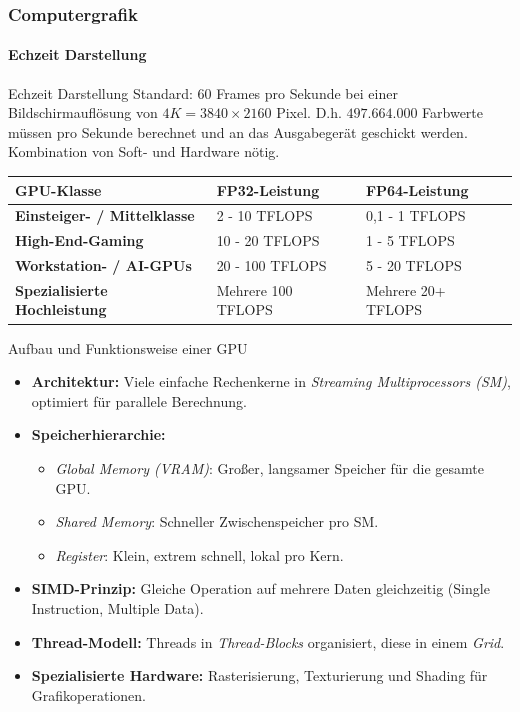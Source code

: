 \documentclass{beamer}
\begin{document}
\begin{frame}
    \frametitle{Computergrafik}
\framesubtitle{Echzeit Darstellung}
    \begin{block}{Echzeit Darstellung}
Standard: $60$ Frames pro Sekunde bei einer Bildschirmauflösung von $4K=3840 \times 2160$ Pixel.  
D.h. $497.664.000$ Farbwerte müssen pro Sekunde berechnet und an das Ausgabegerät
geschickt werden. 
Kombination von Soft- und Hardware nötig.
\end{block}
\begin{table}[h]
    \centering
    \tiny %
    \begin{tabular}{|l|l|l|}
    \hline
    \textbf{GPU-Klasse} & \textbf{FP32-Leistung} & \textbf{FP64-Leistung} \\ \hline
    \textbf{Einsteiger- / Mittelklasse} & 2 - 10 TFLOPS & 0,1 - 1 TFLOPS \\ \hline
    \textbf{High-End-Gaming} & 10 - 20 TFLOPS & 1 - 5 TFLOPS \\ \hline
    \textbf{Workstation- / AI-GPUs} & 20 - 100 TFLOPS & 5 - 20 TFLOPS \\ \hline
    \textbf{Spezialisierte Hochleistung} & Mehrere 100 TFLOPS & Mehrere 20+ TFLOPS \\ \hline
    \end{tabular}
    \end{table}

\end{frame}




\begin{frame}{Aufbau und Funktionsweise einer GPU}
    \begin{itemize}
      \item \textbf{Architektur:} Viele einfache Rechenkerne in \textit{Streaming Multiprocessors (SM)}, optimiert für parallele Berechnung.
      \item \textbf{Speicherhierarchie:}
      \begin{itemize}
        \item \textit{Global Memory (VRAM)}: Großer, langsamer Speicher für die gesamte GPU.
        \item \textit{Shared Memory}: Schneller Zwischenspeicher pro SM.
        \item \textit{Register}: Klein, extrem schnell, lokal pro Kern.
      \end{itemize}
      \item \textbf{SIMD-Prinzip:} Gleiche Operation auf mehrere Daten gleichzeitig (Single Instruction, Multiple Data).
      \item \textbf{Thread-Modell:} Threads in \textit{Thread-Blocks} organisiert, diese in einem \textit{Grid}.
      \item \textbf{Spezialisierte Hardware:} Rasterisierung, Texturierung und Shading für Grafikoperationen.
    \end{itemize}
  \end{frame}
\end{document}
